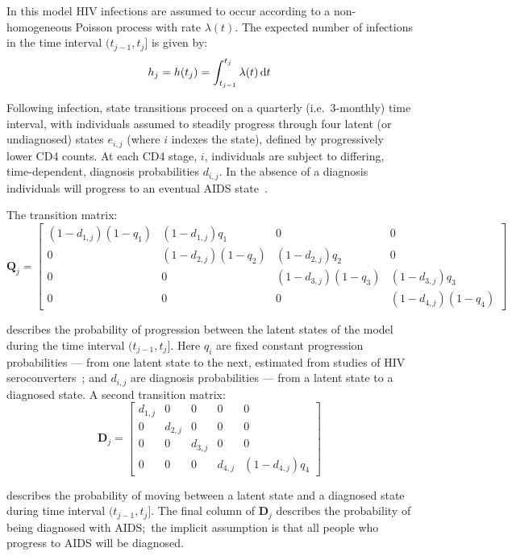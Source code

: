 In this model HIV infections are assumed to occur according to a non-homogeneous Poisson process with rate $\lambda(t)$. The expected number of infections in the time interval $(t_{j-1},t_j]$ is given by:
%
\[
  h_j = h(t_j) = \int_{t_{j-1}}^{t_j}\lambda(t) \mathop{}\!\mathrm{d} t
\]

Following infection, state transitions proceed on a quarterly (i.e.\ 3-monthly) time interval, with individuals assumed to steadily progress through four latent (or undiagnosed) states $e_{i,j}$ (where $i$ indexes the state), defined by progressively lower CD4 counts. At each CD4 stage, $i$, individuals are subject to differing, time-dependent, diagnosis probabilities $d_{i,j}$. In the absence of a diagnosis individuals will progress to an eventual AIDS state~\parencite{Birrell2012-hw}.

The transition matrix:
%
\[
  \mathbf{Q}_j = \begin{bmatrix}
    (1-d_{1,j})(1-q_1) & (1-d_{1,j})q_1     & 0                  & 0                  \\
    0                  & (1-d_{2,j})(1-q_2) & (1-d_{2,j})q_2     & 0                  \\
    0                  & 0                  & (1-d_{3,j})(1-q_3) & (1-d_{3,j})q_3     \\
    0                  & 0                  & 0                  & (1-d_{4,j})(1-q_4)
  \end{bmatrix}
\]

describes the probability of progression between the latent states of the model during the time interval $(t_{j-1},t_j]$. Here $q_i$ are fixed constant progression probabilities --- from one latent state to the next, estimated from studies of HIV seroconverters~\parencite{CASCADE_Concerted_Action_on_SeroConversion_to_AIDS_and_Death_in_Europe_Collaboration2000-wd}; and $d_{i,j}$ are diagnosis probabilities --- from a latent state to a diagnosed state. A second transition matrix:
%
\[
  \mathbf{D}_j = \begin{bmatrix}
    d_{1,j} & 0       & 0       & 0       & 0              \\
    0       & d_{2,j} & 0       & 0       & 0              \\
    0       & 0       & d_{3,j} & 0       & 0              \\
    0       & 0       & 0       & d_{4,j} & (1-d_{4,j})q_4
  \end{bmatrix}
\]

describes the probability of moving between a latent state and a diagnosed state during time interval $(t_{j-1},t_j]$. The final column of $\mathbf{D}_j$ describes the probability of being diagnosed with AIDS;\ the implicit assumption is that all people who progress to AIDS will be diagnosed.

